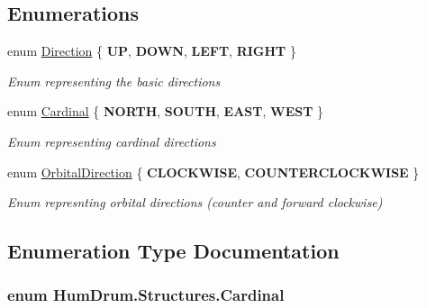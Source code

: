 \subsection*{Enumerations}
\begin{DoxyCompactItemize}
\item 
enum \hyperlink{namespaceHumDrum_1_1Structures_a83ca1f04475980cb7e79d471cc746dd3}{Direction} \{ {\bfseries UP}, 
{\bfseries D\+O\+WN}, 
{\bfseries L\+E\+FT}, 
{\bfseries R\+I\+G\+HT}
 \}\begin{DoxyCompactList}\small\item\em Enum representing the basic directions \end{DoxyCompactList}
\item 
enum \hyperlink{namespaceHumDrum_1_1Structures_ac777de8ca588ec37dd8793047a84192a}{Cardinal} \{ {\bfseries N\+O\+R\+TH}, 
{\bfseries S\+O\+U\+TH}, 
{\bfseries E\+A\+ST}, 
{\bfseries W\+E\+ST}
 \}\begin{DoxyCompactList}\small\item\em Enum representing cardinal directions \end{DoxyCompactList}
\item 
enum \hyperlink{namespaceHumDrum_1_1Structures_a1b5e67f976aea8954390bccad43a9c9e}{Orbital\+Direction} \{ {\bfseries C\+L\+O\+C\+K\+W\+I\+SE}, 
{\bfseries C\+O\+U\+N\+T\+E\+R\+C\+L\+O\+C\+K\+W\+I\+SE}
 \}\begin{DoxyCompactList}\small\item\em Enum represnting orbital directions (counter and forward clockwise) \end{DoxyCompactList}
\end{DoxyCompactItemize}


\subsection{Enumeration Type Documentation}
\subsubsection[{\texorpdfstring{Cardinal}{Cardinal}}]{\setlength{\rightskip}{0pt plus 5cm}enum {\bf Hum\+Drum.\+Structures.\+Cardinal}\hspace{0.3cm}{\ttfamily [strong]}}\hypertarget{namespaceHumDrum_1_1Structures_ac777de8ca588ec37dd8793047a84192a}{}\label{namespaceHumDrum_1_1Structures_ac777de8ca588ec37dd8793047a84192a}


